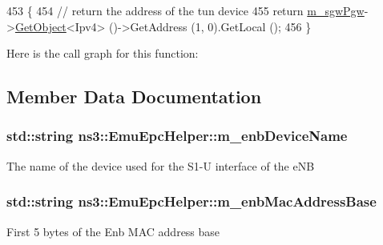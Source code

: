 \begin{DoxyCode}
453 \{
454   \textcolor{comment}{// return the address of the tun device}
455   \textcolor{keywordflow}{return} \hyperlink{classns3_1_1EmuEpcHelper_a5c68f673b82b8c80b5fb88ae986f8cea}{m\_sgwPgw}->\hyperlink{classns3_1_1Object_a13e18c00017096c8381eb651d5bd0783}{GetObject}<Ipv4> ()->GetAddress (1, 0).GetLocal ();
456 \}
\end{DoxyCode}


Here is the call graph for this function\+:




\subsection{Member Data Documentation}
\subsubsection[{\texorpdfstring{m\+\_\+enb\+Device\+Name}{m_enbDeviceName}}]{\setlength{\rightskip}{0pt plus 5cm}std\+::string ns3\+::\+Emu\+Epc\+Helper\+::m\+\_\+enb\+Device\+Name\hspace{0.3cm}{\ttfamily [private]}}\hypertarget{classns3_1_1EmuEpcHelper_a6bd1148381a5fb8d14a20673b4d50420}{}\label{classns3_1_1EmuEpcHelper_a6bd1148381a5fb8d14a20673b4d50420}
The name of the device used for the S1-\/U interface of the e\+NB 
\subsubsection[{\texorpdfstring{m\+\_\+enb\+Mac\+Address\+Base}{m_enbMacAddressBase}}]{\setlength{\rightskip}{0pt plus 5cm}std\+::string ns3\+::\+Emu\+Epc\+Helper\+::m\+\_\+enb\+Mac\+Address\+Base\hspace{0.3cm}{\ttfamily [private]}}\hypertarget{classns3_1_1EmuEpcHelper_a5958f60d6b9a984edace5ee351188e39}{}\label{classns3_1_1EmuEpcHelper_a5958f60d6b9a984edace5ee351188e39}
First 5 bytes of the Enb M\+AC address base 
